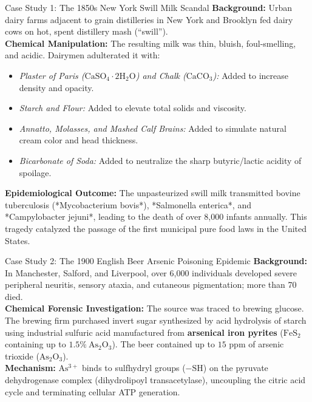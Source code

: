 \documentclass[11pt,a4paper,oneside]{article}
\begin{document}
\begin{casestudybox}{Case Study 1: The 1850s New York Swill Milk Scandal}
\textbf{Background:} Urban dairy farms adjacent to grain distilleries in New York and Brooklyn fed dairy cows on hot, spent distillery mash (``swill'').\\
\textbf{Chemical Manipulation:} The resulting milk was thin, bluish, foul-smelling, and acidic. Dairymen adulterated it with:
\begin{itemize}
    \item \textit{Plaster of Paris ($\mathrm{CaSO_4 \cdot 2H_2O}$) and Chalk ($\mathrm{CaCO_3}$):} Added to increase density and opacity.
    \item \textit{Starch and Flour:} Added to elevate total solids and viscosity.
    \item \textit{Annatto, Molasses, and Mashed Calf Brains:} Added to simulate natural cream color and head thickness.
    \item \textit{Bicarbonate of Soda:} Added to neutralize the sharp butyric/lactic acidity of spoilage.
\end{itemize}
\textbf{Epidemiological Outcome:} The unpasteurized swill milk transmitted bovine tuberculosis (*Mycobacterium bovis*), *Salmonella enterica*, and *Campylobacter jejuni*, leading to the death of over 8,000 infants annually. This tragedy catalyzed the passage of the first municipal pure food laws in the United States.
\end{casestudybox}

\begin{casestudybox}{Case Study 2: The 1900 English Beer Arsenic Poisoning Epidemic}
\textbf{Background:} In Manchester, Salford, and Liverpool, over 6,000 individuals developed severe peripheral neuritis, sensory ataxia, and cutaneous pigmentation; more than 70 died.\\
\textbf{Chemical Forensic Investigation:} The source was traced to brewing glucose. The brewing firm purchased invert sugar synthesized by acid hydrolysis of starch using industrial sulfuric acid manufactured from \textbf{arsenical iron pyrites} ($\mathrm{FeS_2}$ containing up to $1.5\%\ \mathrm{As_2O_3}$). The beer contained up to $15\text{ ppm}$ of arsenic trioxide ($\mathrm{As_2O_3}$).\\
\textbf{Mechanism:} $\mathrm{As^{3+}}$ binds to sulfhydryl groups ($-\mathrm{SH}$) on the pyruvate dehydrogenase complex (dihydrolipoyl transacetylase), uncoupling the citric acid cycle and terminating cellular ATP generation.
\end{casestudybox}
\end{document}
